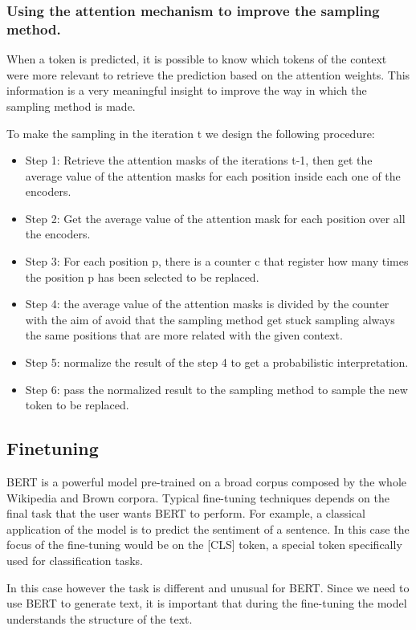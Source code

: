 \documentclass[10pt,twocolumn,letterpaper]{article}
\begin{document}
\subsubsection{Using the attention mechanism to improve the sampling method.}
When a token is predicted, it is possible to know which tokens of the context were more relevant to
retrieve the prediction based on the attention weights. This information is a very meaningful insight to improve
the way in which the sampling method is made.

To make the sampling in the iteration t we design the following procedure:

\begin{itemize}
\item Step 1: Retrieve the attention masks of the iterations t-1, then get the average value of the attention masks for each position inside each one of the encoders.
\item Step 2: Get the average value of the attention mask for each position over all the encoders.
\item Step 3: For each position p, there is a counter c that register how many times the position p has been selected to be replaced.
\item Step 4: the average value of the attention masks is divided by the counter with the aim of avoid that the sampling method get stuck sampling always the same positions that are more related with the given context.
\item Step 5: normalize the result of the step 4 to get a probabilistic interpretation.
\item Step 6: pass the normalized result to the sampling method to sample the new token to be replaced.
\end{itemize}

\subsection{Finetuning}
BERT is a powerful model pre-trained on a broad corpus composed by the whole
Wikipedia and Brown corpora.
Typical fine-tuning techniques depends on the final task that the user wants BERT to perform.
For example, a classical application of the model is to predict the sentiment of a sentence.
In this case the focus of the fine-tuning would be on the [CLS] token,
a special token specifically used for classification tasks.

In this case however the task is different and unusual for BERT.
Since we need to use BERT to generate text, it is important that during the
fine-tuning the model understands the structure of the text.
\end{document}

